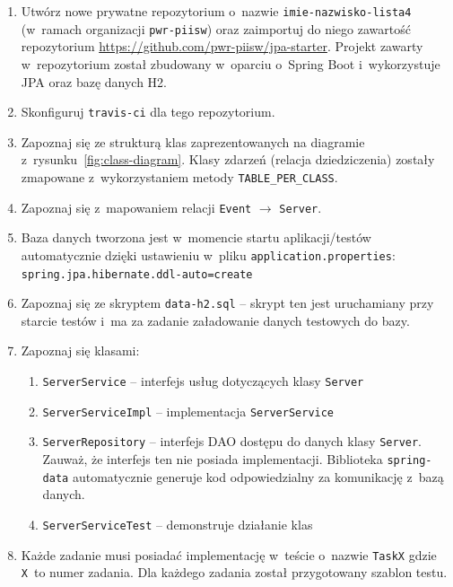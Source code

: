 \documentclass[12pt]{article}
\begin{document}
        \begin{enumerate}
            \item Utwórz nowe prywatne repozytorium o~nazwie \texttt{imie-nazwisko-lista4} (w~ramach organizacji \texttt{pwr-\allowbreak piisw}) oraz zaimportuj do niego zawartość repozytorium \url{https://github.com/pwr-piisw/jpa-starter}. Projekt zawarty w~repozytorium został zbudowany w~oparciu o~Spring Boot i~wykorzystuje JPA oraz bazę danych H2.
            \item Skonfiguruj \texttt{travis-ci} dla tego repozytorium.
            \item Zapoznaj się ze strukturą klas zaprezentowanych na diagramie z~rysunku~\ref{fig:class-diagram}. Klasy zdarzeń (relacja dziedziczenia) zostały zmapowane z~wykorzystaniem metody \texttt{TABLE\_PER\_CLASS}.
            \item Zapoznaj się z~mapowaniem relacji \texttt{Event} $\rightarrow$ \texttt{Server}.
            \item Baza danych tworzona jest w~momencie startu aplikacji/testów automatycznie dzięki ustawieniu w~pliku \texttt{application.properties}: \texttt{spring\-.jpa\-.hibernate\-.ddl-auto=create}
            \item Zapoznaj się ze skryptem \texttt{data-h2.sql} -- skrypt ten jest uruchamiany przy starcie testów i~ma za zadanie załadowanie danych testowych do bazy.
            \item Zapoznaj się klasami:
                \begin{enumerate}
                    \item \texttt{ServerService} – interfejs usług dotyczących klasy \texttt{Server}
                    \item \texttt{ServerServiceImpl} – implementacja \texttt{ServerService}
                    \item \texttt{ServerRepository} – interfejs DAO dostępu do danych klasy \texttt{Server}. Zauważ, że interfejs ten nie posiada implementacji. Biblioteka \texttt{spring-data} automatycznie generuje kod odpowiedzialny za komunikację z~bazą danych.
                    \item \texttt{ServerServiceTest} – demonstruje działanie klas
                \end{enumerate}
            \item Każde zadanie musi posiadać implementację w~teście o~nazwie \texttt{TaskX} gdzie \texttt{X}~to numer zadania. Dla każdego zadania został przygotowany szablon testu.
        \end{enumerate}
\end{document}
